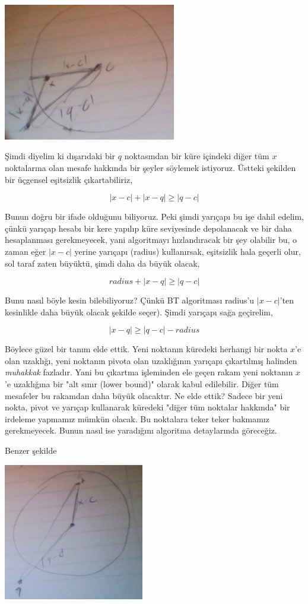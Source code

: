 \documentclass[12pt,fleqn]{article}\usepackage{../../common}
\begin{document}
\includegraphics[height=6cm]{tri1.png}

Şimdi diyelim ki dışarıdaki bir $q$ noktasından bir küre içindeki diğer tüm
$x$ noktalarına olan mesafe hakkında bir şeyler söylemek istiyoruz. Üstteki
şekilden bir üçgensel eşitsizlik çıkartabiliriz,

$$ |x-c| + |x-q| \ge |q-c|  $$

Bunun doğru bir ifade olduğunu biliyoruz. Peki şimdi yarıçapı bu işe dahil
edelim, çünkü yarıçap hesabı bir kere yapılıp küre seviyesinde depolanacak
ve bir daha hesaplanması gerekmeyecek, yani algoritmayı hızlandıracak bir
şey olabilir bu, o zaman eğer $|x-c|$ yerine yarıçapı (radius) kullanırsak,
eşitsizlik hala geçerli olur, sol taraf zaten büyüktü, şimdi daha da büyük
olacak, 

$$ radius + |x-q| \ge |q-c|  $$

Bunu nasıl böyle kesin bilebiliyoruz? Çünkü BT algoritması radius'u
$|x-c|$'ten kesinlikle daha büyük olacak şekilde seçer). Şimdi yarıçapı
sağa geçirelim,

$$ |x-q| \ge |q-c| - radius $$

Böylece güzel bir tanım elde ettik. Yeni noktanın küredeki herhangi bir
nokta $x$'e olan uzaklığı, yeni noktanın pivota olan uzaklığının yarıçapı
çıkartılmış halinden {\em muhakkak} fazladır. Yani bu çıkartma işleminden
ele geçen rakam yeni noktanın $x$'e uzaklığına bir "alt sınır (lower
bound)" olarak kabul edilebilir. Diğer tüm mesafeler bu rakamdan daha büyük
olacaktır. Ne elde ettik? Sadece bir yeni nokta, pivot ve yarıçap
kullanarak küredeki "diğer tüm noktalar hakkında" bir irdeleme yapmamız
mümkün olacak. Bu noktalara teker teker bakmamız gerekmeyecek. Bunun nasıl
ise yaradığını algoritma detaylarında göreceğiz.

Benzer şekilde 

\includegraphics[height=6cm]{tri2.png}
\end{document}
